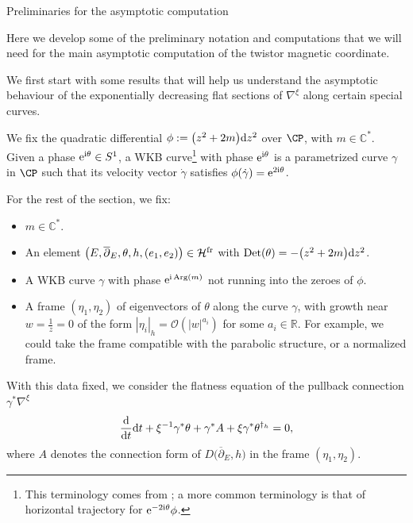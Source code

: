 \begin{subsubsection}{Preliminaries for the asymptotic computation}

Here we develop some of the preliminary notation and computations that we will need for the main asymptotic computation of the twistor magnetic coordinate.

We first start with some results that will help us understand the asymptotic behaviour of the exponentially decreasing flat sections of $\nabla^{\xi}$ along certain special curves.

\begin{Definition}We fix the quadratic differential $\phi:=\bigl(z^2+2m \bigr){\rm d}z^2$ over $\CP$, with $m\in \mathbb{C}^*$. Given a phase ${\rm e}^{{\rm i}\theta} \in S^1$, a WKB curve\footnote{This terminology comes from \cite{GMN2}; a more common terminology is that of horizontal trajectory for ${\rm e}^{-2{\rm i}\theta}\phi$.} with phase ${\rm e}^{{\rm i}\theta}$ is a parametrized curve $\gamma$ in $\CP$ such that its velocity vector $\dot{\gamma}$ satisfies $
 \phi (\dot{\gamma})= {\rm e}^{2{\rm i}\theta}$.
\end{Definition}

For the rest of the section, we fix:
\begin{itemize}\itemsep=0pt
 \item $m\in \mathbb{C}^*$.
 \item An element $\bigl(E,\overline{\partial}_E,\theta,h,(e_1,e_2)\bigr)\in \mathcal{H}^{{\rm fr}}$ with $\operatorname{Det}(\theta)=-\bigl(z^2+2m\bigr){\rm d}z^2$.
 \item A WKB curve $\gamma$ with phase ${\rm e}^{{\rm i} \operatorname{Arg}(m)}$ not running into the zeroes of $\phi$.
 \item A frame $(\eta_1,\eta_2)$ of eigenvectors of $\theta$ along the curve $\gamma$, with growth near $w=\frac{1}{z}=0$ of the form $|\eta_i|_h=\mathcal{O}(|w|^{a_i})$ for some $a_i \in \mathbb{R}$. For example, we could take the frame compatible with the parabolic structure, or a normalized frame.
\end{itemize}

With this data fixed, we consider the flatness equation of the pullback connection $\gamma^*\nabla^{\xi}$
\begin{equation*}
 \frac{{\rm d}}{{\rm d}t}{\rm d}t +\xi^{-1}\gamma^*\theta + \gamma^*A + \xi \gamma^* \theta ^{\dagger_h}=0,
\end{equation*}
where $A$ denotes the connection form of $D\bigl(\overline{\partial}_E,h\bigr)$ in the frame $(\eta_1,\eta_2)$.


\end{subsubsection}
